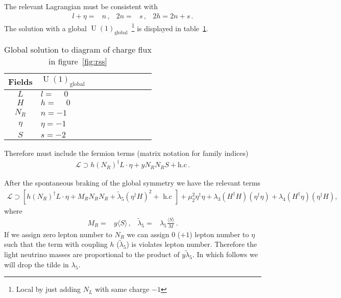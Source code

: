 The relevant Lagrangian must be consistent with
\begin{align}
  l+\eta=&n\,,& 2n=&s\,, & 2h=2n+s\,.
\end{align}
The solution with a global $\operatorname{U}(1)_{\text{global}}$~\cite{Suematsu:2017kcu}\footnote{Local by just adding $N_L$ with same charge $-1$} is displayed in table~\ref{tab:suematsu}.

\begin{table}
  \centering
  \begin{tabular}{c|ll}
    Fields&$\operatorname{U}(1)_{\text{global}}$& $\phantom{\operatorname{U}(1)_X}$\\ \hline
    $L$   & $l=\phantom{-}0$&$\phantom{l=-1}$\\
    $H$   & $h=\phantom{-}0$&$\phantom{h=-1-l=0}$\\
    $N_R$ & $n=-1$          &$\phantom{n=-1/2}$\\
    $\eta$& $\eta=-1$       &$\phantom{-1/2-l=1/2}$ \\
    $S$   & $s=-2$         &$\phantom{s=-1}$ \\
  \end{tabular}
  \caption{Global solution to diagram of charge flux in figure~\ref{fig:rss}}
  \label{tab:suematsu}
\end{table}

Therefore must include the fermion terms (matrix notation for family indices)
\begin{align}
  \mathcal{L}\supset h \left( N_R \right)^{\dagger} L \cdot \eta + y N_R N_R S + \text{h.c}\,.
\end{align}

After the spontaneous braking of the global symmetry we have the relevant terms
\begin{align}
  \mathcal{L}\supset \left[ h \left( N_R \right)^{\dagger} L \cdot \eta + M_R N_R N_R  +
  \widetilde{\lambda}_{5}\left(\eta^{\dagger} H\right)^{2}+\text { h.c } \right]
  +\mu_{2}^{2} \eta^{\dagger} \eta+\lambda_{3}\left(H^{\dagger} H\right)\left(\eta^{\dagger} \eta\right)+\lambda_{4}\left(H^{\dagger} \eta\right)\left(\eta^{\dagger} H\right),
\end{align}
where
\begin{align}
 M_R=& y \langle S \rangle\,,& \widetilde{\lambda}_5=&\lambda_5 \frac{\langle S \rangle }{M}\,.
\end{align}
If we assign zero lepton number to $N_R$ we can assign $0$ ($+1$)
lepton number to $\eta$ such that the term with coupling $h$
($\widetilde{\lambda}_5$) is violates lepton number. Therefore the
light neutrino masses are proportional to the product of
$y \widetilde{\lambda}_5$. In which follows we will drop the tilde in
$\lambda_5$.

